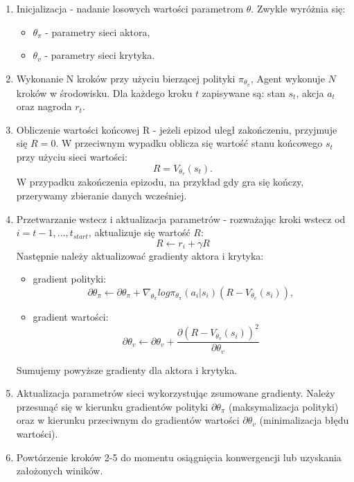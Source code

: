 \documentclass[a4paper, 12pt]{article}
\numberwithin{equation}{section}
\begin{document}
    \begin{enumerate}
        \item Inicjalizacja - nadanie losowych wartości parametrom \( \theta \). Zwykle wyróżnia się: 
        \begin{itemize}
            \item \( \theta_{\pi} \) - parametry sieci aktora,
            \item  \( \theta_v \) - parametry sieci krytyka.
        \end{itemize}
        \item Wykonanie N kroków przy użyciu bierzącej polityki \( \pi_{\theta_\pi} \), Agent wykonuje \( N \) kroków w środowisku. Dla każdego kroku \( t \) zapisywane są: stan \( s_t \), akcja \( a_t \) oraz nagroda \( r_t \).
        \item Obliczenie wartości końcowej R - jeżeli epizod uległ zakończeniu, przyjmuje się \( R = 0 \). W przeciwnym wypadku oblicza się wartość stanu końcowego \(s_{t} \) przy użyciu sieci wartości: 
        \begin{equation}
        R = V_{\theta_v}(s_{t}).
        \end{equation}
        W przypadku zakończenia epizodu, na przykład gdy gra się kończy, przerywamy zbieranie danych wcześniej.
        \item Przetwarzanie wstecz i aktualizacja parametrów - 
        rozważając kroki wstecz od \( i = t-1, ..., t_{start} \), aktualizuje się wartość \( R \):
        \begin{equation}
        R \leftarrow r_i + \gamma R 
        \end{equation}
        Następnie należy aktualizować gradienty aktora i krytyka:
        \begin{itemize}
            \item gradient polityki:
            \begin{equation}
            \partial \theta_\pi \leftarrow \partial \theta_\pi +  \nabla_{\theta_\pi} log \pi_{\theta_\pi} (a_i|s_i) (R-V_{\theta_v}(s_i)),
            \end{equation}
            \item gradient wartości:
            \begin{equation}
            \partial \theta_v \leftarrow \partial \theta_v + \frac{\partial(R-V_{\theta_v}(s_i))^2}{\partial \theta_v}
            \end{equation}
        \end{itemize}
        Sumujemy powyższe gradienty dla aktora i krytyka.
        \item Aktualizacja parametrów sieci wykorzystując zsumowane gradienty. Należy przesunąć się w kierunku gradientów polityki \( \partial \theta_\pi \) (maksymalizacja polityki) oraz w kierunku przeciwnym do gradientów wartości \( \partial \theta_v \) (minimalizacja błędu wartości).
        \item Powtórzenie kroków 2-5 do momentu osiągnięcia konwergencji lub uzyskania założonych winików.
    \end{enumerate}
\end{document}
